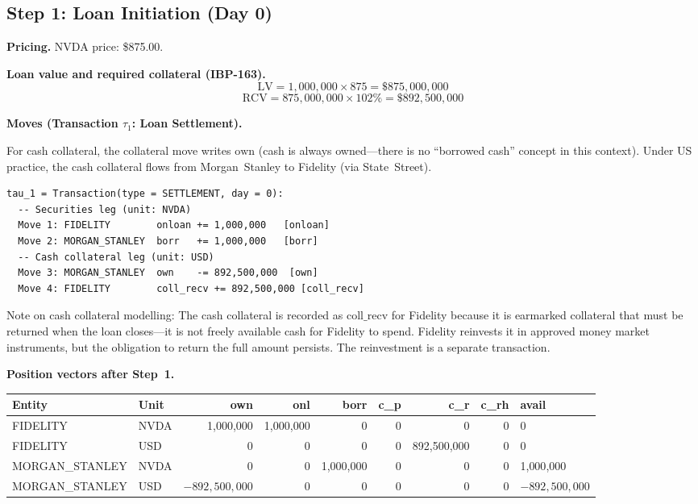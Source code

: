 \documentclass[11pt,a4paper]{article}
\begin{document}
\subsection{Step 1: Loan Initiation (Day 0)}
\label{sec:us-step1}

\noindent\textbf{Pricing.} NVDA price: \$875.00.

\medskip
\noindent\textbf{Loan value and required collateral (IBP-163).}
\[
\mathrm{LV} = 1{,}000{,}000 \times 875 = \$875{,}000{,}000
\]
\[
\mathrm{RCV} = 875{,}000{,}000 \times 102\% = \$892{,}500{,}000
\]

\medskip
\noindent\textbf{Moves (Transaction $\tau_1$: Loan Settlement).}

For cash collateral, the collateral move writes $\mathrm{own}$ (cash is always owned---there is no ``borrowed cash'' concept in this context). Under US practice, the cash collateral flows from Morgan~Stanley to Fidelity (via State~Street).

\begin{lstlisting}
tau_1 = Transaction(type = SETTLEMENT, day = 0):
  -- Securities leg (unit: NVDA)
  Move 1: FIDELITY        onloan += 1,000,000   [onloan]
  Move 2: MORGAN_STANLEY  borr   += 1,000,000   [borr]
  -- Cash collateral leg (unit: USD)
  Move 3: MORGAN_STANLEY  own    -= 892,500,000  [own]
  Move 4: FIDELITY        coll_recv += 892,500,000 [coll_recv]
\end{lstlisting}

\noindent Note on cash collateral modelling: The cash collateral is recorded as $\mathrm{coll\_recv}$ for Fidelity because it is earmarked collateral that must be returned when the loan closes---it is not freely available cash for Fidelity to spend. Fidelity reinvests it in approved money market instruments, but the obligation to return the full amount persists. The reinvestment is a separate transaction.

\medskip
\noindent\textbf{Position vectors after Step~1.}

\begin{center}\small
\begin{tabular}{l l r r r r r r l}
\toprule
\textbf{Entity} & \textbf{Unit} & own & onl & borr & c\_p & c\_r & c\_rh & avail \\
\midrule
FIDELITY & NVDA & 1{,}000{,}000 & 1{,}000{,}000 & 0 & 0 & 0 & 0 & 0 \\
FIDELITY & USD & 0 & 0 & 0 & 0 & 892{,}500{,}000 & 0 & 0 \\
\midrule
MORGAN\_STANLEY & NVDA & 0 & 0 & 1{,}000{,}000 & 0 & 0 & 0 & 1{,}000{,}000 \\
MORGAN\_STANLEY & USD & $-892{,}500{,}000$ & 0 & 0 & 0 & 0 & 0 & $-892{,}500{,}000$ \\
\bottomrule
\end{tabular}
\end{center}
\end{document}

